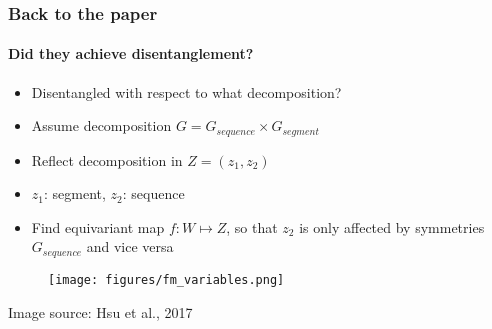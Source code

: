 \documentclass[9pt]{beamer}
\begin{document}





\begin{frame}
\frametitle{Back to the paper}
\framesubtitle{Did they achieve disentanglement?}
\begin{itemize}
	\item Disentangled with respect to what decomposition?
	\item Assume decomposition $G = G_{sequence} \times G_{segment}$
	\item Reflect decomposition in $Z= (z_1, z_2)$
	\item $z_1$: segment, $z_2$: sequence
	\item Find equivariant map $f:W\mapsto Z$, so that $z_2$ is only affected by symmetries $G_{sequence}$ and vice versa%
\end{itemize}
\begin{figure}
	\texttt{[image: figures/fm\_variables.png]}
\end{figure}
\begin{tiny}
	Image source: Hsu et al., 2017 
\end{tiny}
\end{frame} 
\end{document}
